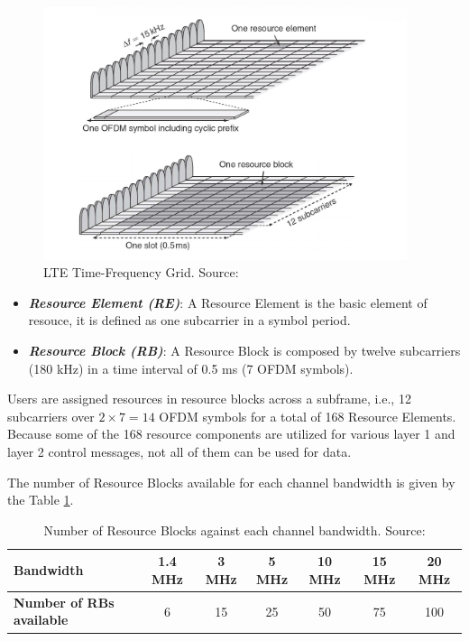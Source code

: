 \begin{figure}[h]
  \centering
  \includegraphics[width=0.95\textwidth]{img/lte_rb.png}
  \caption{LTE Time-Frequency Grid. Source:\cite{cmov1} }
  \label{fig:lterb}
\end{figure}

\begin{itemize}
  \item \textbf{\textit{Resource Element (RE)}}: A Resource Element is the basic element of resouce, it is
  defined as one subcarrier in a symbol period.
  \item \textbf{\textit{Resource Block (RB)}}: A Resource Block is composed by twelve subcarriers (180 kHz) in 
  a time interval of 0.5 ms (7 OFDM symbols).
\end{itemize}


Users are assigned resources in resource blocks across a subframe, i.e., 12 subcarriers over ${2\times7 = 14}$
OFDM symbols for a total of 168 Resource Elements. Because some of the 168 resource components are utilized 
for various layer 1 and layer 2 control messages, not all of them can be used for data.

The number of Resource Blocks available for each channel bandwidth is given by the Table \ref{table:rb}. 

\begin{table}[h]
  \centering
  \begin{tabular}{@{}lcccccc@{}}
  \toprule
  \textbf{Bandwidth}               & 1.4 MHz & 3 MHz & 5 MHz & 10 MHz & 15 MHz & 20 MHz \\ \midrule
  \textbf{Number of RBs available} & 6       & 15    & 25    & 50     & 75     & 100    \\ \bottomrule
  \end{tabular}
  \caption{Number of Resource Blocks against each channel bandwidth. Source: \cite{ofdma1}}
  \label{table:rb}
\end{table}

